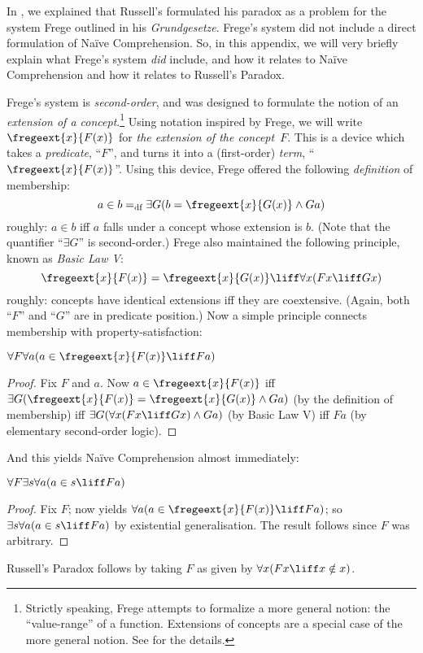 \documentclass[../../../include/open-logic-section]{subfiles}
\begin{document}

In , we explained that Russell's formulated his
paradox as a problem for the system Frege outlined in his
\emph{Grundgesetze}. Frege's system did not include a direct
formulation of Na\"{i}ve Comprehension. So, in this appendix, we will
very briefly explain what Frege's system \emph{did} include, and how
it relates to Na\"ive Comprehension and how it relates to Russell's
Paradox.

Frege's system is \emph{second-order}, and was designed to formulate
the notion of an \emph{extension of a concept}.\footnote{Strictly
speaking, Frege attempts to formalize a more general notion: the
``value-range'' of a function. Extensions of concepts are a special
case of the more general notion. See \cite[pp.\ 8--9]{Heck2012} for
the details.} Using notation inspired by Frege, we will write
$\fregeext{x}{F(x)}$ for \emph{the extension of the concept~$F$}. This
is a device which takes a \emph{predicate}, ``$F$'', and turns it into
a (first-order) \emph{term}, ``$\fregeext{x}{F(x)}$''. Using this
device, Frege offered the following \emph{definition} of membership:
\[
	a \in b =_\text{df} \exists G(b = \fregeext{x}{G(x)} \land Ga)
\]
roughly: $a \in b$ iff $a$ falls under a concept whose extension is
$b$. (Note that the quantifier ``$\exists G$'' is second-order.) Frege
also maintained the following principle, known as \emph{Basic Law V}: 
$$\fregeext{x}{F(x)} = \fregeext{x}{G(x)} \liff \forall x (Fx \liff Gx)$$
roughly: concepts have identical extensions iff they are coextensive. (Again, both ``$F$'' and ``$G$'' are in predicate position.) Now a simple principle connects membership with property-satisfaction:

\begin{lem}
$\forall F \forall a(a \in \fregeext{x}{F(x)} \liff Fa)$
\end{lem}

\begin{proof} 
Fix $F$ and $a$. Now $a \in \fregeext{x}{F(x)}$ iff $\exists G(\fregeext{x}{F(x)}
= \fregeext{x}{G(x)} \land Ga)$ (by the definition of membership) iff
$\exists G(\forall x(Fx \liff Gx) \land Ga)$ (by Basic Law V) iff $Fa$
(by elementary second-order logic).
\end{proof}

And this yields Na\"ive Comprehension almost immediately:

\begin{lem}
$\forall F \exists s \forall a (a \in s \liff Fa)$
\end{lem}

\begin{proof}
Fix $F$; now  yields $\forall a (a \in
\fregeext{x}{F(x)} \liff Fa)$; so $\exists s\forall a(a \in s \liff Fa)$ by
existential generalisation. The result follows since $F$ was
arbitrary.
\end{proof}

Russell's Paradox follows by taking $F$ as given by $\forall x(Fx \liff x \notin x)$. 
\end{document}
